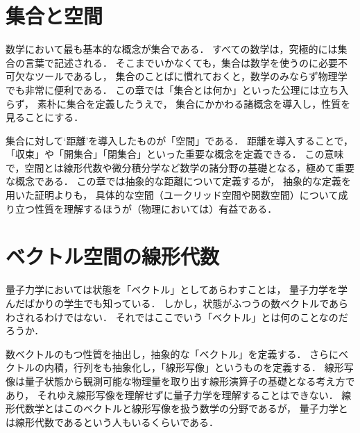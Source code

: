 \documentclass{sotsu}
\begin{document}
\tableofcontents




\chapter{集合と空間}
\label{sec:set-and-space}

数学において最も基本的な概念が集合である．
すべての数学は，究極的には集合の言葉で記述される．
そこまでいかなくても，集合は数学を使うのに必要不可欠なツールであるし，
集合のことばに慣れておくと，数学のみならず物理学でも非常に便利である．
この章では「集合とは何か」といった公理には立ち入らず，
素朴に集合を定義したうえで，
集合にかかわる諸概念を導入し，性質を見ることにする．

集合に対して`距離'を導入したものが「空間」である．
距離を導入することで，「収束」や「開集合」「閉集合」といった重要な概念を定義できる．
この意味で，空間とは線形代数や微分積分学など数学の諸分野の基礎となる，極めて重要な概念である．
この章では抽象的な距離について定義するが，
抽象的な定義を用いた証明よりも，
具体的な空間（ユークリッド空間や関数空間）について成り立つ性質を理解するほうが（物理においては）有益である．










\chapter{ベクトル空間の線形代数}
\label{sec:linear-algebra}

量子力学においては状態を「ベクトル」としてあらわすことは，
量子力学を学んだばかりの学生でも知っている．
しかし，状態がふつうの数ベクトルであらわされるわけではない．
それではここでいう「ベクトル」とは何のことなのだろうか．

数ベクトルのもつ性質を抽出し，抽象的な「ベクトル」を定義する．
さらにベクトルの内積，行列をも抽象化し，「線形写像」というものを定義する．
線形写像は量子状態から観測可能な物理量を取り出す線形演算子の基礎となる考え方であり，
それゆえ線形写像を理解せずに量子力学を理解することはできない．
線形代数学とはこのベクトルと線形写像を扱う数学の分野であるが，
量子力学とは線形代数であるという人もいるくらいである．





\end{document}
